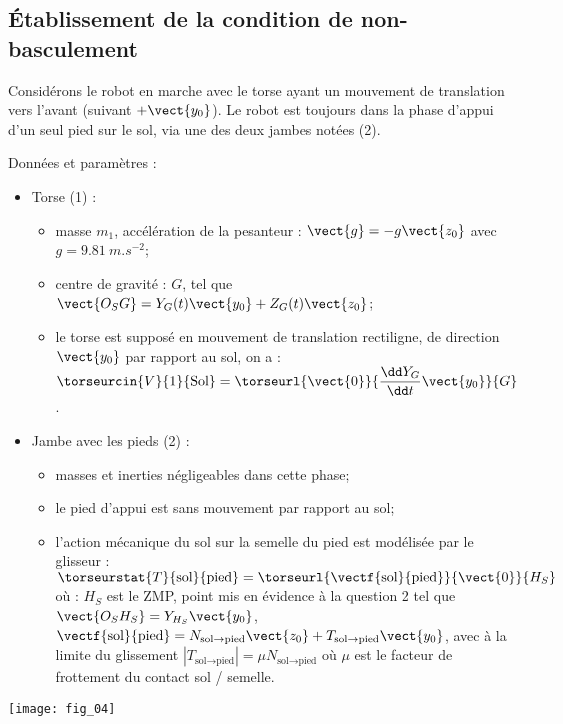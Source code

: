 \begin{multicols}{2}
\subsection*{Établissement de la condition de non-basculement}
\ifprof
\else

Considérons le robot en marche avec le torse ayant un mouvement de
translation vers l’avant (suivant $+\vect{y_0}$). Le robot est toujours dans la
phase d'appui d'un seul pied sur le sol, via une des deux jambes notées
(2).

Données et paramètres :
\begin{itemize}
\item Torse (1) :
\begin{itemize}
\item masse $m_1$, accélération de la pesanteur : $\vect{g}=-g\vect{z_0}$ avec
$g=\SI{9,81}{m.s^{-2}}$;
\item centre de gravité : $G$, tel que $\vect{O_SG}=Y_G(t)\vect{y_0}+Z_G(t)\vect{z_0}$;
\item le torse est supposé en mouvement de translation rectiligne, de direction $\vect{y_0}$ par rapport au sol, on a : $\torseurcin{V}{1}{\text{Sol}}=\torseurl{\vect{0}}{\dfrac{\dd Y_G}{\dd t}\vect{y_0}}{G}$.
\end{itemize}
\item Jambe avec les pieds (2) :
\begin{itemize}
\item masses et inerties négligeables dans cette phase;
\item le pied d'appui est sans mouvement par rapport au sol;
\item l'action mécanique du sol sur la semelle du pied est modélisée par le glisseur : $\torseurstat{T}{\text{sol}}{\text{pied}}=\torseurl{\vectf{\text{sol}}{\text{pied}}}{\vect{0}}{H_S}$
où : $H_S$ est le ZMP, point mis en évidence à la question 2 tel que $\vect{O_S H_S}=Y_{H_S}\vect{y_0}$, 
 $\vectf{\text{sol}}{\text{pied}}=N_{\text{sol}\rightarrow \text{pied}}\vect{z_0}+T_{\text{sol}\rightarrow \text{pied}}\vect{y_0}$, avec à la limite du glissement $\left| T_{\text{sol}\rightarrow \text{pied}}\right| = \mu N_{\text{sol}\rightarrow \text{pied}}$ où $\mu$ est le facteur de frottement du contact sol / semelle.
\end{itemize}
\end{itemize}

\begin{center}
\texttt{[image: fig\_04]}
\end{center}
\fi


\end{multicols}

